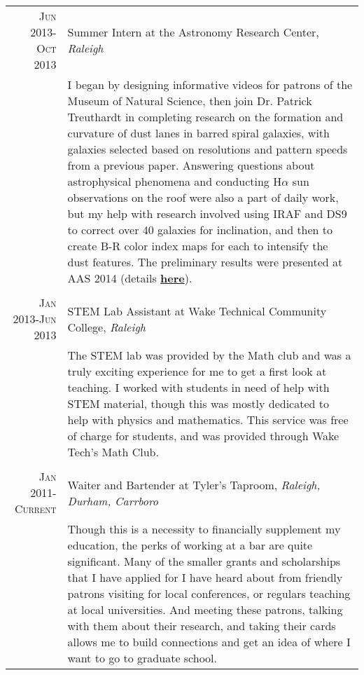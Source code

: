 \documentclass[a4paper,10pt]{article} %
\begin{document}
\begin{tabular}{r|p{11cm}}

\textsc{Jun 2013-Oct 2013} & Summer Intern at the Astronomy Research Center, \emph{Raleigh}\\
& \footnotesize{I began by designing informative videos for patrons of the Museum of Natural Science, then join Dr. Patrick Treuthardt in completing research on the formation and curvature of dust lanes in barred spiral galaxies, with galaxies selected based on resolutions and pattern speeds from a previous paper. Answering questions about astrophysical phenomena and conducting H$\alpha$ sun observations on the roof were also a part of daily work, but my help with research involved using IRAF and DS9 to correct over 40 galaxies for inclination, and then to create B-R color index maps for each to intensify the dust features. The preliminary results were presented at AAS 2014 (details \textbf{\href{http://adsabs.harvard.edu/abs/2014AAS...22345312T}{here}}).}\\
\multicolumn{2}{c}{} \\


\textsc{Jan 2013-Jun 2013} & STEM Lab Assistant at Wake Technical Community College, \emph{Raleigh}\\
& \footnotesize{The STEM lab was provided by the Math club and was a truly exciting experience for me to get a first look at teaching. I worked with students in need of help with STEM material, though this was mostly dedicated to help with physics and mathematics. This service was free of charge for students, and was provided through Wake Tech's Math Club.}\\
\multicolumn{2}{c}{} \\


\textsc{Jan 2011-Current} & Waiter and Bartender at Tyler's Taproom, \emph{Raleigh, Durham, Carrboro}\\
& \footnotesize{Though this is a necessity to financially supplement my education, the perks of working at a bar are quite significant. Many of the smaller grants and scholarships that I have applied for I have heard about from friendly patrons visiting for local conferences, or regulars teaching at local universities. And meeting these patrons, talking with them about their research, and taking their cards allows me to build connections and get an idea of where I want to go to graduate school.}
\end{tabular}
\end{document}
